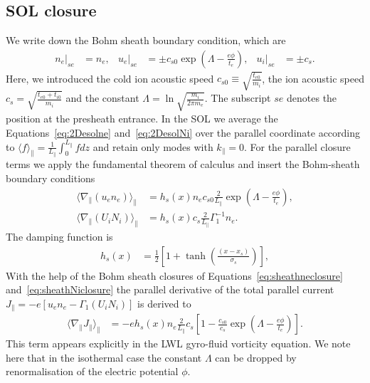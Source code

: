 \documentclass{hitec} %
\begin{document}
\subsection{SOL closure}\label{sec:solclosure}
We write down the Bohm sheath boundary condition, which are 
\begin{align}
 n_e \Big|_{se} &= n_e, &
 u_e \Big|_{se} &= \pm c_{s0} \exp{\left(\Lambda-\frac{e \phi}{t_e}\right)},&
 u_i \Big|_{se} &= \pm c_{s}.
\end{align}
Here, we introduced the cold ion acoustic speed \(c_{s0} \equiv \sqrt{\frac{t_{e0} }{ m_i}}\), the ion acoustic speed \(c_{s} = \sqrt{\frac{t_{e0} + t_{i0} }{ m_i}}\) and the constant \(\Lambda = \ln{\sqrt{ \frac{m_i}{2 \pi m_e} }}\). 
The subscript \(se\) denotes the position at the presheath entrance.
In the  SOL we average the Equations~\eqref{eq:2Desolne} and~\eqref{eq:2DesolNi} over the parallel coordinate 
according to \(\langle f\rangle_\parallel =  \frac{1}{L_\parallel} \int_{0}^{L_\parallel} f d z \) and retain only modes with \(k_\parallel = 0\). 
For the parallel closure terms we apply the fundamental theorem of calculus and insert the Bohm-sheath boundary conditions
\begin{align}\label{eq:sheathneclosure}
 \langle \nabla_\parallel (u_e n_e)  \rangle_\parallel 
 &=
		       h_{s}(x)  n_e c_{s0} \frac{2}{L_\parallel}\exp{\left(\Lambda-\frac{e \phi}{t_e}\right)}, \\
		        \label{eq:sheathNiclosure}
   \langle \nabla_\parallel (U_i N_i)   \rangle_\parallel
		      &= h_{s}(x) c_{s} \frac{2}{L_\parallel}  \Gamma_1^{-1}  n_e .
\end{align}
The damping function is 
\begin{align}
 h_{s}(x) &=\frac{1}{2}\left[1+ \tanh{\left(\frac{(x-x_s)}{\sigma_s}\right)}\right] ,
\end{align}
With the help of the Bohm sheath closures of Equations~\eqref{eq:sheathneclosure} and~\eqref{eq:sheathNiclosure} the parallel derivative of the total parallel current 
\(J_\parallel = -e  \left[u_e n_e - \Gamma_1 (U_i N_i)\right] \) is derived to
\begin{align}
 \langle \nabla_\parallel  J_\parallel \rangle_\parallel &= - e h_{s}(x)  n_e  \frac{2}{L_\parallel}c_{s}  \left[1-\frac{c_{s0}}{ c_{s} } \exp{\left(\Lambda-\frac{e \phi}{t_e}\right)} \right].
\end{align}
This term appears explicitly in the LWL gyro-fluid vorticity equation. We note here that in the isothermal case the constant \(\Lambda\) can be dropped by renormalisation of the electric potential \(\phi\).
\end{document}
